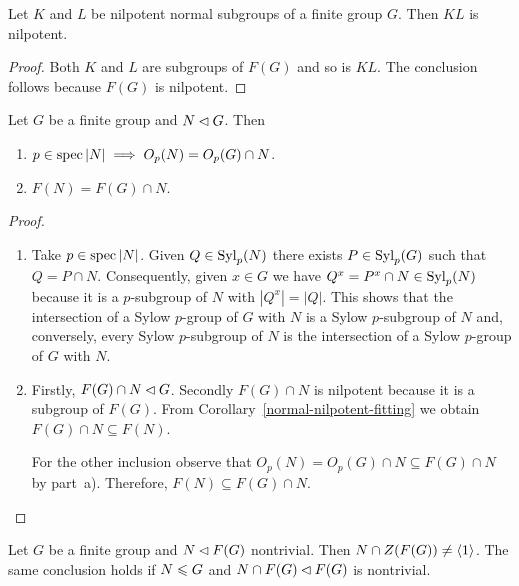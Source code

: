 \begin{cor}
    Let\/ $K$ and\/ $L$ be nilpotent normal subgroups of a finite group\/ $G$. Then\/ $KL$ is nilpotent.
\end{cor}

\begin{proof} Both $K$ and $L$ are subgroups of $F(G)$ and so is $KL$. The conclusion follows because $F(G)$ is nilpotent.  \end{proof}

\begin{cor}\label{fitting-intersection-normal}
    Let $G$ be a finite group and $N\lhd G$. Then
    \begin{enumerate}[\upshape a)]
        \item $p\in\operatorname{spec}|N|\implies O_p(N)=O_p(G)\cap N$.
        \item $F(N)=F(G)\cap N$.
    \end{enumerate}
\end{cor}

\begin{proof}${}$
\begin{enumerate}[\upshape a)]
    \item Take $p\in\operatorname{spec}|N|$. Given $Q\in{\rm Syl}_p(N)$ there exists $P\in{\rm Syl}_p(G)$ such that $Q=P\cap N$. Consequently, given $x\in G$ we have $Q^x=P^x\cap N\in{\rm Syl}_p(N)$ because it is a $p$-subgroup of $N$ with $|Q^x|=|Q|$. This shows that the intersection of a Sylow $p$-group of $G$ with $N$ is a Sylow $p$-subgroup of $N$ and, conversely, every Sylow $p$-subgroup of $N$ is the intersection of a Sylow $p$-group of $G$ with $N$.

    \item Firstly, $F(G)\cap N\lhd G$. Secondly $F(G)\cap N$ is nilpotent because it is a subgroup of $F(G)$. From Corollary~\ref{normal-nilpotent-fitting} we obtain $F(G)\cap N\subseteq F(N)$.

    For the other inclusion observe that $O_p(N) = O_p(G)\cap N\subseteq F(G)\cap N$ by part~a). Therefore, $F(N)\subseteq F(G)\cap N$.
\end{enumerate}
\end{proof}

\begin{prop}\label{nontrivial-fitting-center}
    Let\/ $G$ be a finite group and\/ $N\lhd F(G)$ nontrivial. Then $N\cap Z(F(G))\ne\langle1\rangle$. The same conclusion holds if\/ $N\leqslant G$ and\/ $N\cap F(G)\lhd F(G)$ is nontrivial.
\end{prop}

